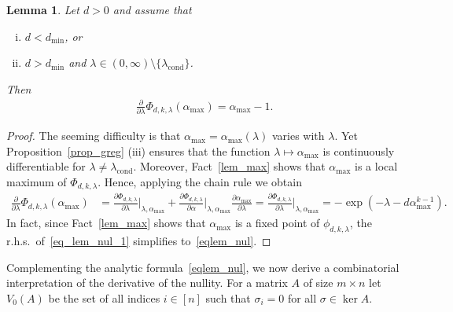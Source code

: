 \documentclass[10pt,reqno]{amsart}
\numberwithin{equation}{section}
\newcommand\dmin{d_{\mathrm{min}}}
\newcommand{\amax}{\alpha_{\max}}
\newcommand{\lcond}{\lambda_{\mathrm{cond}}}
\newcommand{\frz}{V_0}
\newcommand\bc[1]{\left({#1}\right)}
\newcommand\Prop{Proposition}
\newtheorem{lemma}[definition]{Lemma}
\begin{document}
\begin{lemma}\label{lem_nul}
	Let $d>0$ and assume that
	\begin{enumerate}[(i)]
		\item $d<\dmin$, or
		\item $d>\dmin$ and $\lambda\in(0,\infty)\setminus\{\lcond\}$.
	\end{enumerate}
Then
\begin{align}\label{eqlem_nul}
	\frac{\partial}{\partial\lambda}\Phi_{d,k,\lambda}(\amax)=\amax-1.
\end{align}
\end{lemma}
\begin{proof}
	The seeming difficulty is that $\amax=\amax(\lambda)$ varies with $\lambda$.
	Yet \Prop~\ref{prop_greg} (iii) ensures that the function $\lambda\mapsto\amax$ is continuously differentiable for $\lambda\neq\lcond$.
	Moreover, Fact~\ref{lem_max} shows that $\amax$ is a local maximum of $\Phi_{d,k,\lambda}$.
	Hence, applying the chain rule we obtain
	\begin{align}\label{eq_lem_nul_1}
		\frac\partial{\partial\lambda}\Phi_{d,k,\lambda}(\amax)&=\frac{\partial\Phi_{d,k,\lambda}}{\partial\lambda}\bigg|_{\lambda,\amax}+\frac{\partial\Phi_{d,k,\lambda}}{\partial\alpha}\bigg|_{\lambda,\amax}\frac{\partial\amax}{\partial\lambda}=\frac{\partial\Phi_{d,k,\lambda}}{\partial\lambda}\bigg|_{\lambda,\amax}=-\exp\bc{-\lambda-d\amax^{k-1}}.
	\end{align}
	In fact, since Fact~\ref{lem_max} shows that $\amax$ is a fixed point of $\phi_{d,k,\lambda}$, the r.h.s.\ of~\eqref{eq_lem_nul_1} simplifies to~\eqref{eqlem_nul}.
\end{proof}

Complementing the analytic formula~\eqref{eqlem_nul}, we now derive a combinatorial interpretation of the derivative of the nullity.
For a matrix $A$ of size $m\times n$ let $\frz(A)$ be the set of all indices $i\in[n]$ such that $\sigma_i=0$ for all $\sigma\in\ker A$.
\end{document}
